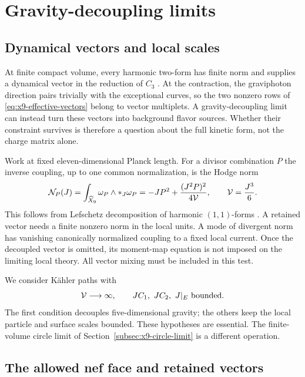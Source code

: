 \section{Gravity-decoupling limits}
\label{sec:decoupling}

\subsection{Dynamical vectors and local scales}
\label{subsec:dynamic-background}

At finite compact volume, every harmonic two-form has finite norm and
supplies a dynamical vector in the reduction of $C_3$
\cite{Cadavid:1995bk}. At the contraction, the graviphoton direction
pairs trivially with the exceptional curves, so the two nonzero rows
of \eqref{eq:x9-effective-vectors} belong to vector multiplets.
A gravity-decoupling limit can instead turn these vectors into
background flavor sources. Whether their constraint survives is
therefore a question about the full kinetic form, not the charge
matrix alone.

Work at fixed eleven-dimensional Planck length. For a divisor
combination $P$ the inverse coupling, up to one common normalization,
is the Hodge norm
\begin{equation}
 \mathcal N_P(J)=\int_{\widehat X_9}\omega_P\wedge *_J\omega_P
 =-JP^2+\frac{(J^2P)^2}{4\mathcal V},\qquad
 \mathcal V=\frac{J^3}{6}.
 \label{eq:norm-formula}
\end{equation}
This follows from Lefschetz decomposition of harmonic $(1,1)$-forms
\cite{Candelas:1990pi,Strominger:1990pd}. A retained vector needs a
finite nonzero norm in the local units. A mode of divergent norm has
vanishing canonically normalized coupling to a fixed local current.
Once the decoupled vector is omitted, its moment-map equation is not
imposed on the limiting local theory. All vector mixing must be
included in this test.

We consider K\"ahler paths with
\begin{equation}
 \mathcal V\longrightarrow\infty,\qquad
 J C_1,\ J C_2,\ J|_E\ \hbox{bounded}.
 \label{eq:gravity-decoupling}
\end{equation}
The first condition decouples five-dimensional gravity; the others
keep the local particle and surface scales bounded. These hypotheses
are essential. The finite-volume circle limit of
Section~\ref{subsec:x9-circle-limit} is a different operation.

\subsection{The allowed nef face and retained vectors}
\label{subsec:x9-rigid-limits}

